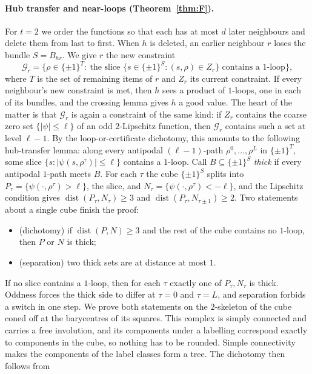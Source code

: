 \documentclass[11pt,letterpaper]{article}
\theoremstyle{definition}
\newcommand{\cG}{\mathcal{G}}
\newcommand{\cube}[1]{\{\pm1\}^{#1}}
\DeclareMathOperator{\dist}{dist}
\begin{document}
\paragraph{Hub transfer and near-loops (Theorem~\ref{thm:F}).}
For $t=2$ we order the functions so that each has at most $d$ later neighbours and delete them
from last to first. When $h$ is deleted, an earlier neighbour $r$ loses the bundle $S=B_{hr}$. We
give $r$ the new constraint
\[
  \cG_r=\bigl\{\rho\in\cube T:\ \text{the slice }\{s\in\cube S:(s,\rho)\in Z_r\}\text{ contains a $1$-loop}\bigr\},
\]
where $T$ is the set of remaining items of $r$ and $Z_r$ its current constraint. If every
neighbour's new constraint is met, then $h$ sees a product of $1$-loops, one in each of its
bundles, and the crossing lemma gives $h$ a good value. The heart of the matter is that $\cG_r$ is
again a constraint of the same kind: if $Z_r$ contains the coarse zero set $\{|\psi|\le\ell\}$ of
an odd $2$-Lipschitz function, then $\cG_r$ contains such a set at level $\ell-1$. By the
loop-or-certificate dichotomy, this amounts to the following hub-transfer lemma: along every
antipodal $(\ell-1)$-path $\rho^0,\dots,\rho^L$ in $\cube T$, some slice
$\{s:|\psi(s,\rho^\tau)|\le\ell\}$ contains a $1$-loop. Call $B\subseteq\cube S$ \emph{thick} if every
antipodal $1$-path meets $B$. For each $\tau$ the cube $\cube S$ splits into
$P_\tau=\{\psi(\cdot,\rho^\tau)>\ell\}$, the slice, and $N_\tau=\{\psi(\cdot,\rho^\tau)<-\ell\}$, and
the Lipschitz condition gives $\dist(P_\tau,N_\tau)\ge3$ and $\dist(P_\tau,N_{\tau\pm1})\ge2$. Two
statements about a single cube finish the proof:
\begin{itemize}[leftmargin=*,itemsep=1pt]
\item (dichotomy) if $\dist(P,N)\ge3$ and the rest of the cube contains no $1$-loop, then $P$ or $N$
is thick;
\item (separation) two thick sets are at distance at most $1$.
\end{itemize}
If no slice contains a $1$-loop, then for each $\tau$ exactly one of $P_\tau,N_\tau$ is thick.
Oddness forces the thick side to differ at $\tau=0$ and $\tau=L$, and separation forbids a switch in
one step. We prove both statements on the $2$-skeleton of the cube coned off at the barycentres of
its squares. This complex is simply connected and carries a free involution, and its components
under a labelling correspond exactly to components in the cube, so nothing has to be rounded. Simple
connectivity makes the components of the label classes form a tree. The dichotomy then follows from
\end{document}
